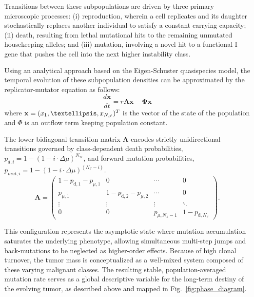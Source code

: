 \documentclass[10pt, aps, rmp,  twocolumn, superscriptaddress, floatfix, showkeys]{revtex4-2}
\begin{document}
Transitions between these subpopulations are driven by three primary microscopic processes: (i) reproduction, wherein a cell replicates and its daughter stochastically replaces another individual to satisfy a constant carrying capacity; (ii) death, resulting from lethal mutational hits to the remaining unmutated housekeeping alleles; and (iii) mutation, involving a novel hit to a functional I gene that pushes the cell into the next higher instability class.

Using an analytical approach based on the  Eigen-Schuster quasispecies model, the temporal evolution of these subpopulation densities can be approximated by the replicator-mutator equation as follows:
\begin{equation}
    \frac{d\mathbf{x}}{dt}=r\mathbf{A}\mathbf{x}-\mathbf{\Phi}\mathbf{x}
\end{equation}
where ${\bf x}=(x_1,…,x_{N_{\mathcal{I}}})^T$ is the vector of the state of the population and $\Phi$ is an outflow term keeping population constant.


The lower-bidiagonal transition matrix $\mathbf{A}$ encodes strictly unidirectional transitions governed by class-dependent death probabilities, $p_{d,i} =1-(1-i\cdot\Delta\mu)^{N_{\mathcal{H}}}$, and forward mutation probabilities, $p_{mut,i} = 1-(1-i\cdot\Delta\mu)^{(N_{\mathcal{I}}-i)}$. 
{\small $$\mathbf{A} =
\begin{pmatrix}
1 - p_{\mathrm{d},1} - p_{\mu,1} & 0  & \cdots & 0 \\[4pt]
p_{\mu,1} & 1 - p_{\mathrm{d},2} - p_{\mu,2}  & \cdots & 0 \\[4pt]
\vdots & \vdots & \vdots & \ddots  \\[4pt]
0 & 0 & p_{\mu,N_{\mathcal{I}}-1} & 1 - p_{\mathrm{d},N_{\mathcal{I}}}
\end{pmatrix}.$$}

This configuration represents the asymptotic state where mutation accumulation saturates the underlying phenotype, allowing simultaneous multi-step jumps and back-mutations to be neglected as higher-order effects. Because of high clonal turnover, the tumor mass is conceptualized as a well-mixed system composed of these varying malignant classes. The resulting stable, population-averaged mutation rate serves as a global descriptive variable for the long-term destiny of the evolving tumor, as described above and mapped in Fig.~\ref{fig:phase_diagram}.
\end{document}
